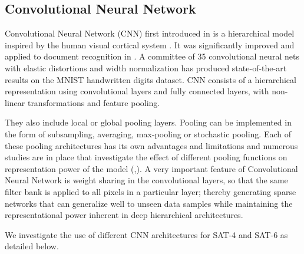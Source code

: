 \documentclass[11pt,a4paper]{article}
\begin{document}
\subsection{Convolutional Neural Network}
Convolutional Neural Network (CNN) first introduced in \cite{fukushima:neocognitronbc} is a hierarchical model inspired by the human visual cortical system \cite{Hubel:62}. It was significantly improved and applied to document recognition in \cite{Lecun98gradient-basedlearning}. A committee of 35 convolutional neural nets with elastic distortions and width normalization \cite{Ciresan2012} has produced state-of-the-art results on the MNIST handwritten digits dataset. CNN consists of a hierarchical representation using convolutional layers and fully connected layers, with non-linear transformations and feature pooling. 

They also include local or global pooling layers. Pooling can be implemented in the form of subsampling, averaging, max-pooling or stochastic pooling. Each of these pooling architectures has its own advantages and limitations and numerous studies are in place that investigate the effect of different pooling functions on representation power of the model (\cite{Scherer2010},\cite{ICML2011Saxe_551}). A very important feature of Convolutional Neural Network is weight sharing in the convolutional layers, so that the same filter bank is applied to all pixels in a particular layer; thereby generating sparse networks that can generalize well to unseen data samples while maintaining the representational power inherent in deep hierarchical architectures. 

We investigate the use of different CNN architectures for SAT-4 and SAT-6 as detailed below.
\end{document}
